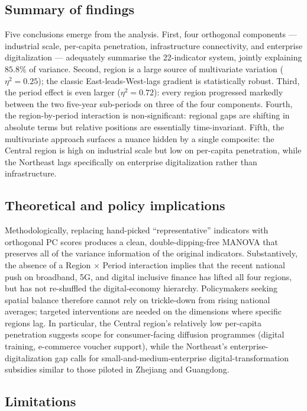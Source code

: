 \documentclass[12pt,letterpaper]{article}
\begin{document}
\subsection{Summary of findings}

Five conclusions emerge from the analysis.  {First}, four orthogonal
components --- industrial scale, per-capita penetration, infrastructure
connectivity, and enterprise digitalization --- adequately summarise the
22-indicator system, jointly explaining $85.8\%$ of variance.
{Second}, region is a large source of multivariate variation
($\eta^{2}=0.25$); the classic East-leads-West-lags gradient is statistically
robust.  {Third}, the period effect is even larger ($\eta^{2}=0.72$):
every region progressed markedly between the two five-year sub-periods on three
of the four components.  {Fourth}, the region-by-period interaction is
non-significant: regional gaps are shifting in absolute terms but {relative}
positions are essentially time-invariant.  {Fifth}, the multivariate
approach surfaces a nuance hidden by a single composite: the Central region
is high on industrial scale but low on per-capita penetration, while the
Northeast lags specifically on enterprise digitalization rather than
infrastructure.

\subsection{Theoretical and policy implications}

Methodologically, replacing hand-picked ``representative'' indicators with
orthogonal PC scores produces a clean, double-dipping-free MANOVA that
preserves all of the variance information of the original indicators.
Substantively, the absence of a Region $\times$ Period interaction implies
that the recent national push on broadband, 5G, and digital inclusive finance
has lifted all four regions, but has {not} re-shuffled the digital-economy
hierarchy.  Policymakers seeking spatial balance therefore cannot rely on
trickle-down from rising national averages; targeted interventions are needed
on the dimensions where specific regions lag.  In particular, the Central
region's relatively low per-capita penetration suggests scope for
consumer-facing diffusion programmes (digital training, e-commerce voucher
support), while the Northeast's enterprise-digitalization gap calls for
small-and-medium-enterprise digital-transformation subsidies similar to those
piloted in Zhejiang and Guangdong.

\subsection{Limitations}
\end{document}
